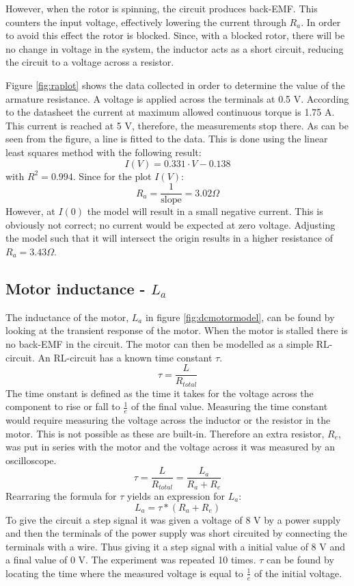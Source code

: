 However, when the rotor is spinning, the circuit produces back-EMF.
This counters the input voltage, effectively lowering the current through $R_a$.
In order to avoid this effect the rotor is blocked.
Since, with a blocked rotor, there will be no change in voltage in the system, the inductor acts as a short circuit, reducing the circuit to a voltage across a resistor. 

Figure \ref{fig:raplot} shows the data collected in order to determine the value of the armature resistance.
A voltage is applied across the terminals at 0.5 V.
According to the datasheet \cite{pittmann} the current at maximum allowed continuous torque is 1.75 A.
This current is reached at 5 V, therefore, the measurements stop there.
As can be seen from the figure, a line is fitted to the data.
This is done using the linear least squares method with the following result:
$$I(V)=0.331\cdot V-0.138$$
with $R^2=0.994$.
Since for the plot $I(V)$:
$$R_a = \frac{1}{\text{slope}} = 3.02\Omega$$
However, at $I(0)$ the model will result in a small negative current.
This is obviously not correct; no current would be expected at zero voltage.
Adjusting the model such that it will intersect the origin results in a higher resistance of $R_a=3.43\Omega$.

\subsection{Motor inductance - $L_a$}
The inductance of the motor, $L_a$ in figure \ref{fig:dcmotormodel}, can be found by looking at the transient response of the motor. 
When the motor is stalled there is no back-EMF in the circuit. The motor can then be modelled as a simple RL-circuit. 
An RL-circuit has a known time constant $\tau$.
$$\tau = \frac{L}{R_{total}}$$
The time onstant is defined as the time it takes for the voltage across the component to rise or fall to $\frac{1}{e}$ of the final value.
Measuring the time constant would require measuring the voltage across the inductor or the resistor in the motor. This is not possible as these are built-in. 
Therefore an extra resistor, $R_e$, was put in series with the motor and the voltage across it was measured by an oscilloscope. 
$$\tau = \frac{L}{R_{total}} = \frac{L_a}{R_a+R_e}$$
Rearraring the formula for $\tau$ yields an expression for $L_a$: 
$$L_a = \tau * (R_a + R_e)$$
To give the circuit a step signal it was given a voltage of 8 V by a power supply and then the terminals of the power supply was  short circuited by connecting the terminals with a wire. Thus giving it a step signal with a initial value of 8 V and a final value of 0 V.
The experiment was repeated 10 times. $\tau$ can be found by locating the time where the measured voltage is equal to $\frac{1}{e}$ of the initial voltage.

